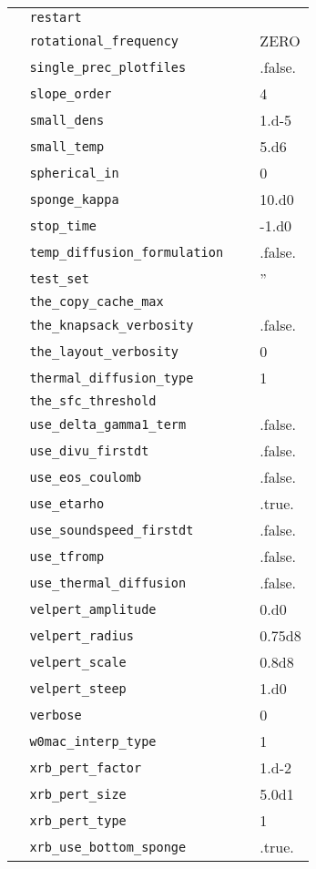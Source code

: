 \begin{center}
\begin{longtable}{|l|p{3.0in}|l|}
\verb=  restart =  &   &  \\
\verb=  rotational_frequency =  &   &  ZERO \\
\verb=  single_prec_plotfiles =  &   &  .false. \\
\verb=  slope_order =  &   &  4 \\
\verb=  small_dens =  &   &  1.d-5 \\
\verb=  small_temp =  &   &  5.d6 \\
\verb=  spherical_in =  &   &  0 \\
\verb=  sponge_kappa =  &   &  10.d0 \\
\verb=  stop_time =  &   &  -1.d0 \\
\verb=  temp_diffusion_formulation =  &   &  .false. \\
\verb=  test_set =  &   &  '' \\
\verb=  the_copy_cache_max =  &   &  \\
\verb=  the_knapsack_verbosity =  &   &  .false. \\
\verb=  the_layout_verbosity =  &   &  0 \\
\verb=  thermal_diffusion_type =  &   &  1 \\
\verb=  the_sfc_threshold =  &   &  \\
\verb=  use_delta_gamma1_term =  &   &  .false. \\
\verb=  use_divu_firstdt =  &   &  .false. \\
\verb=  use_eos_coulomb =  &   &  .false. \\
\verb=  use_etarho =  &   &  .true. \\
\verb=  use_soundspeed_firstdt =  &   &  .false. \\
\verb=  use_tfromp =  &   &  .false. \\
\verb=  use_thermal_diffusion =  &   &  .false. \\
\verb=  velpert_amplitude =  &   &  0.d0 \\
\verb=  velpert_radius =  &   &  0.75d8 \\
\verb=  velpert_scale =  &   &  0.8d8 \\
\verb=  velpert_steep =  &   &  1.d0 \\
\verb=  verbose =  &   &  0 \\
\verb=  w0mac_interp_type =  &   &  1 \\
\verb=  xrb_pert_factor =  &   &  1.d-2 \\
\verb=  xrb_pert_size =  &   &  5.0d1 \\
\verb=  xrb_pert_type =  &   &  1 \\
\verb=  xrb_use_bottom_sponge =  &   &  .true. \\

\end{longtable}
\end{center}
%

